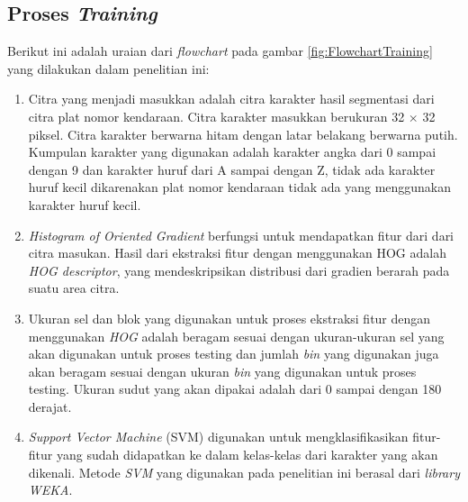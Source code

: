 \subsection{Proses \textit{Training}}
\begin{adjustbox}{width=1\textwidth}
	\noindent
	\begin{minipage}{\linewidth}
		\label{fig:FlowchartTraining}
	\end{minipage}
\end{adjustbox}
Berikut ini adalah uraian dari \textit{flowchart} pada gambar \ref{fig:FlowchartTraining} yang dilakukan dalam penelitian ini:
\begin{enumerate}
	\item Citra yang menjadi masukkan adalah citra karakter hasil segmentasi dari citra plat nomor kendaraan. Citra karakter masukkan berukuran 32 $\times$ 32 piksel. Citra karakter berwarna hitam dengan latar belakang berwarna putih. Kumpulan karakter yang digunakan adalah karakter angka dari 0 sampai dengan 9 dan karakter huruf dari A sampai dengan Z, tidak ada karakter huruf kecil dikarenakan plat nomor kendaraan tidak ada yang menggunakan karakter huruf kecil.
	\item \textit{Histogram of Oriented Gradient} berfungsi untuk mendapatkan fitur dari dari citra masukan. Hasil dari ekstraksi fitur dengan menggunakan HOG adalah \textit{HOG descriptor}, yang mendeskripsikan distribusi dari gradien berarah pada suatu area citra.
	\item Ukuran sel dan blok yang digunakan untuk proses ekstraksi fitur dengan menggunakan \textit{HOG} adalah beragam sesuai dengan ukuran-ukuran sel yang akan digunakan untuk proses testing dan jumlah \textit{bin} yang digunakan juga akan beragam sesuai dengan ukuran \textit{bin} yang digunakan untuk proses testing. Ukuran sudut yang akan dipakai adalah dari 0 sampai dengan 180 derajat.
	\item \textit{Support Vector Machine} (SVM) digunakan untuk mengklasifikasikan fitur-fitur yang sudah didapatkan ke dalam kelas-kelas dari karakter yang akan dikenali. Metode \textit{SVM} yang digunakan pada penelitian ini berasal dari \textit{library WEKA}.\\
\end{enumerate}


